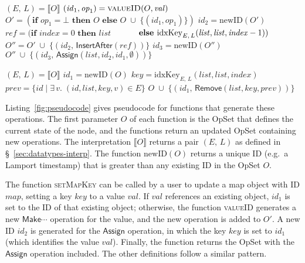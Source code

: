 \begin{algorithm}[t]
\begin{minipage}[t]{0.5\textwidth}
\begin{algorithmic}
    \State $(E,\, L) = \llbracket O \rrbracket$
    \State $(\mathit{id}_1, \mathit{op}_1) = \Call{valueID}{O, \mathit{val}}$
    \State $O' = (\textbf{if } \mathit{op}_1 = \bot \textbf{ then } O \textbf{ else } 
        O \;\cup\; \big\{ (\mathit{id}_1, \mathit{op}_1) \big\})$
    \State $\mathit{id}_2 = \mathrm{newID}(O')$
    \State $\mathit{ref} = (\textbf{if } \mathit{index}=0 \textbf{ then } \mathit{list}$
    \State $\hphantom{\mathit{ref} = (}\textbf{else } \mathrm{idxKey}_{E,\, L}(\mathit{list}, \mathit{list}, \mathit{index} - 1))$
    \State $O'' = O' \;\cup\; \big\{ (\mathit{id}_2,\, \mathsf{InsertAfter}(\mathit{ref})) \big\}$
    \State $\mathit{id}_3 = \mathrm{newID}(O'')$
    \State \Return $O'' \;\cup\; \big\{ (\mathit{id}_3,\, \mathsf{Assign}(\mathit{list}, \mathit{id}_2, \mathit{id}_1, \emptyset)) \big\}$
    \EndFunction\Statex

    \State $(E,\, L) = \llbracket O \rrbracket$
    \State $\mathit{id}_1 = \mathrm{newID}(O)$
    \State $\mathit{key} = \mathrm{idxKey}_{E,\, L}(\mathit{list}, \mathit{list}, \mathit{index})$
    \State $\mathit{prev} = \{ \mathit{id} \mid \exists\,v.\; (\mathit{id}, \mathit{list}, \mathit{key}, v) \in E \}$
    \State \Return $O \;\cup\; \big\{ (\mathit{id}_1,\, \mathsf{Remove}(\mathit{list}, \mathit{key}, \mathit{prev})) \big\}$
    \EndFunction
\end{algorithmic}
\end{minipage}
\end{algorithm}

\noindent
Listing~\ref{fig:pseudocode} gives pseudocode for functions that generate these operations.
The first parameter $O$ of each function is the OpSet that defines the current state of the node, and the functions return an updated OpSet containing new operations.
The interpretation $\llbracket O \rrbracket$ returns a pair $(E,\, L)$ as defined in \S~\ref{sec:datatypes-interp}.
The function $\mathrm{newID}(O)$ returns a unique ID (e.g.\ a Lamport timestamp) that is greater than any existing ID in the OpSet $O$.

The function \textsc{setMapKey} can be called by a user to update a map object with ID $\mathit{map}$, setting a key $\mathit{key}$ to a value $\mathit{val}$.
If $\mathit{val}$ references an existing object, $\mathit{id}_1$ is set to the ID of that existing object; otherwise, the function \textsc{valueID} generates a new $\mathsf{Make}\cdots$ operation for the value, and the new operation is added to $O'$.
A new ID $\mathit{id}_2$ is generated for the $\mathsf{Assign}$ operation, in which the key $\mathit{key}$ is set to $\mathit{id}_1$ (which identifies the value $\mathit{val}$).
Finally, the function returns the OpSet with the $\mathsf{Assign}$ operation included.
The other definitions follow a similar pattern.

